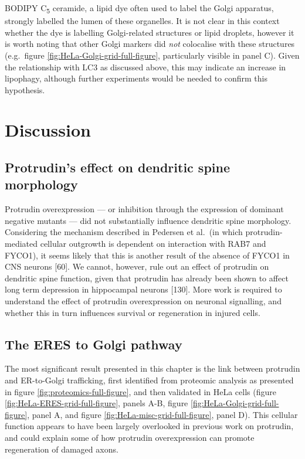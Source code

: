 \documentclass[
  12pt,
  a4paper,
]{book}
\begin{document}
BODIPY C\textsubscript{5} ceramide, a lipid dye often used to label the Golgi apparatus, strongly labelled the lumen of these organelles. It is not clear in this context whether the dye is labelling Golgi-related structures or lipid droplets, however it is worth noting that other Golgi markers did \emph{not} colocalise with these structures (e.g.~figure \ref{fig:HeLa-Golgi-grid-full-figure}, particularly visible in panel C). Given the relationship with LC3 as discussed above, this may indicate an increase in lipophagy, although further experiments would be needed to confirm this hypothesis.

\section{Discussion}\label{discussion}

\subsection{Protrudin's effect on dendritic spine morphology}\label{protrudins-effect-on-dendritic-spine-morphology}

Protrudin overexpression --- or inhibition through the expression of dominant negative mutants --- did not substantially influence dendritic spine morphology. Considering the mechanism described in Pedersen et al.~(in which protrudin-mediated cellular outgrowth is dependent on interaction with RAB7 and FYCO1), it seems likely that this is another result of the absence of FYCO1 in CNS neurons {[}60{]}. We cannot, however, rule out an effect of protrudin on dendritic spine function, given that protrudin has already been shown to affect long term depression in hippocampal neurons {[}130{]}. More work is required to understand the effect of protrudin overexpression on neuronal signalling, and whether this in turn influences survival or regeneration in injured cells.

\subsection{The ERES to Golgi pathway}\label{the-eres-to-golgi-pathway}

The most significant result presented in this chapter is the link between protrudin and ER-to-Golgi trafficking, first identified from proteomic analysis as presented in figure \ref{fig:proteomics-full-figure}, and then validated in HeLa cells (figure \ref{fig:HeLa-ERES-grid-full-figure}, panels A-B, figure \ref{fig:HeLa-Golgi-grid-full-figure}, panel A, and figure \ref{fig:HeLa-misc-grid-full-figure}, panel D). This cellular function appears to have been largely overlooked in previous work on protrudin, and could explain some of how protrudin overexpression can promote regeneration of damaged axons.
\end{document}
